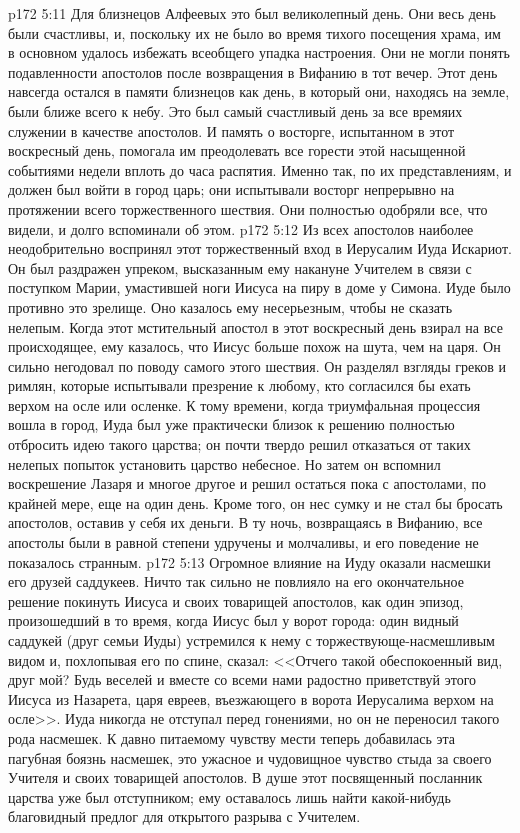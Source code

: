 \vs p172 5:11 Для близнецов Алфеевых это был великолепный день. Они весь день были счастливы, и, поскольку их не было во время тихого посещения храма, им в основном удалось избежать всеобщего упадка настроения. Они не могли понять подавленности апостолов после возвращения в Вифанию в тот вечер. Этот день навсегда остался в памяти близнецов как день, в который они, находясь на земле, были ближе всего к небу. Это был самый счастливый день за все времяих служении в качестве апостолов. И память о восторге, испытанном в этот воскресный день, помогала им преодолевать все горести этой насыщенной событиями недели вплоть до часа распятия. Именно так, по их представлениям, и должен был войти в город царь; они испытывали восторг непрерывно на протяжении всего торжественного шествия. Они полностью одобряли все, что видели, и долго вспоминали об этом.
\vs p172 5:12 Из всех апостолов наиболее неодобрительно воспринял этот торжественный вход в Иерусалим Иуда Искариот. Он был раздражен упреком, высказанным ему накануне Учителем в связи с поступком Марии, умастившей ноги Иисуса на пиру в доме у Симона. Иуде было противно это зрелище. Оно казалось ему несерьезным, чтобы не сказать нелепым. Когда этот мстительный апостол в этот воскресный день взирал на все происходящее, ему казалось, что Иисус больше похож на шута, чем на царя. Он сильно негодовал по поводу самого этого шествия. Он разделял взгляды греков и римлян, которые испытывали презрение к любому, кто согласился бы ехать верхом на осле или осленке. К тому времени, когда триумфальная процессия вошла в город, Иуда был уже практически близок к решению полностью отбросить идею такого царства; он почти твердо решил отказаться от таких нелепых попыток установить царство небесное. Но затем он вспомнил воскрешение Лазаря и многое другое и решил остаться пока с апостолами, по крайней мере, еще на один день. Кроме того, он нес сумку и не стал бы бросать апостолов, оставив у себя их деньги. В ту ночь, возвращаясь в Вифанию, все апостолы были в равной степени удручены и молчаливы, и его поведение не показалось странным.
\vs p172 5:13 Огромное влияние на Иуду оказали насмешки его друзей саддукеев. Ничто так сильно не повлияло на его окончательное решение покинуть Иисуса и своих товарищей апостолов, как один эпизод, произошедший в то время, когда Иисус был у ворот города: один видный саддукей (друг семьи Иуды) устремился к нему с торжествующе\hyp{}насмешливым видом и, похлопывая его по спине, сказал: <<Отчего такой обеспокоенный вид, друг мой? Будь веселей и вместе со всеми нами радостно приветствуй этого Иисуса из Назарета, царя евреев, въезжающего в ворота Иерусалима верхом на осле>>. Иуда никогда не отступал перед гонениями, но он не переносил такого рода насмешек. К давно питаемому чувству мести теперь добавилась эта пагубная боязнь насмешек, это ужасное и чудовищное чувство стыда за своего Учителя и своих товарищей апостолов. В душе этот посвященный посланник царства уже был отступником; ему оставалось лишь найти какой\hyp{}нибудь благовидный предлог для открытого разрыва с Учителем.
